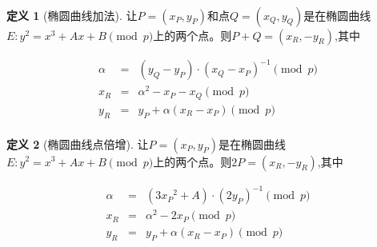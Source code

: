 \documentclass{article}
\theoremstyle{definition}
\newtheorem{definition}{\indent 定义}
\begin{document}
~\\

\begin{definition}[椭圆曲线加法]
让$P = (x_P,y_P)$和点$Q = (x_Q,y_Q)$是在椭圆曲线$E:y^2 = x^3+Ax+B \pmod{p}$上的两个点。则$P+Q = (x_R,-y_R)$,其中

\begin{eqnarray}   
\label{eq}
\alpha &=&\left(y_{Q}-y_{P}\right) \cdot\left(x_{Q}-x_{P}\right)^{-1} \pmod{p} \nonumber \\ 
x_{R} &=& \alpha^{2}-x_{P}-x_{Q}\pmod{p} \nonumber \\ 
y_{R} &=& y_{P}+\alpha\left(x_{R}-x_{P}\right) \pmod{p}\nonumber \\ 
\nonumber 
\end{eqnarray}
\end{definition}

\begin{definition}[椭圆曲线点倍增]
让$P = (x_P,y_P)$是在椭圆曲线$E:y^2 = x^3+Ax+B \pmod{p}$上的两个点。则$2P = (x_R,-y_R)$,其中

\begin{eqnarray}   
\label{eq}
\alpha &=&\left(3{x_P}^2 + A\right) \cdot\left(2y_P\right)^{-1} \pmod{p} \nonumber \\ 
x_{R} &=& \alpha^{2}-2x_{P}\pmod{p} \nonumber \\ 
y_{R} &=& y_{P}+\alpha\left(x_{R}-x_{P}\right) \pmod{p}\nonumber \\ 
\nonumber 
\end{eqnarray}
\end{definition}
\end{document}
